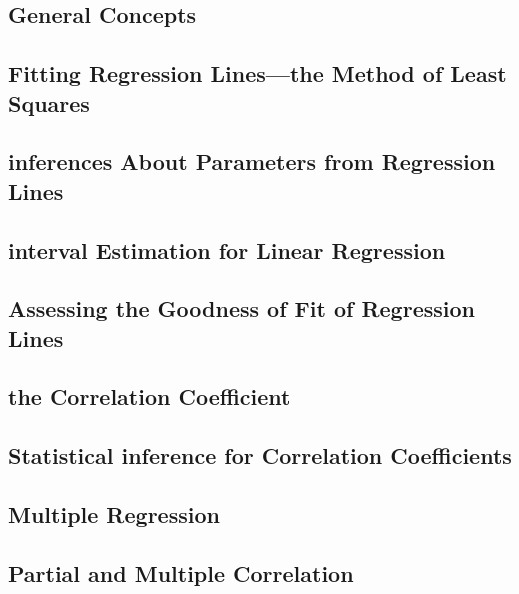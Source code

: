 \documentclass[12pt,]{article}
\theoremstyle{definition}
\theoremstyle{definition}
\theoremstyle{definition}
\theoremstyle{remark}
\begin{document}
\subsection{General Concepts}\label{general-concepts-2}

\subsection{Fitting Regression Lines---the Method of Least
Squares}\label{fitting-regression-linesthe-method-of-least-squares}

\subsection{inferences About Parameters from Regression
Lines}\label{inferences-about-parameters-from-regression-lines}

\subsection{interval Estimation for Linear
Regression}\label{interval-estimation-for-linear-regression}

\subsection{Assessing the Goodness of Fit of Regression
Lines}\label{assessing-the-goodness-of-fit-of-regression-lines}

\subsection{the Correlation
Coefficient}\label{the-correlation-coefficient}

\subsection{Statistical inference for Correlation
Coefficients}\label{statistical-inference-for-correlation-coefficients}

\subsection{Multiple Regression}\label{multiple-regression}

\subsection{Partial and Multiple
Correlation}\label{partial-and-multiple-correlation}
\end{document}
